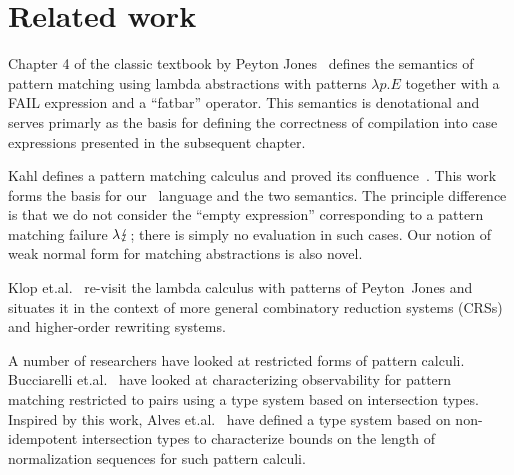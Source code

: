 
\section{Related work}\label{sec:related}

Chapter 4 of the classic textbook by Peyton Jones~\cite{spj_1987}
defines the semantics of pattern matching using lambda abstractions
with patterns $\lambda p.E$ together with a \textsf{FAIL} expression
and a ``fatbar'' operator. This semantics is
denotational and serves primarly as the basis for defining the
correctness of compilation into case expressions presented in
the subsequent chapter.

Kahl defines a pattern matching calculus and proved its
confluence~\cite{kahl_2004}. This work forms the basis for our
\lambdaPMC\ language and the two semantics. The principle difference
is that we do not consider the ``empty expression'' corresponding to a
pattern matching failure $\lambda\lightning$; there is simply no
evaluation in such cases.  Our notion of weak normal form for matching
abstractions is also novel. %

Klop et.\@ al.\@~\cite{KLOP200816} re-visit the lambda calculus with
patterns of Peyton~Jones and situates it in the context of more
general combinatory reduction systems (CRSs) and higher-order
rewriting systems.

A number of researchers have looked at restricted forms of pattern
calculi.  Bucciarelli et.\@ al.\@~\cite{bucciarelli_et_al_2015} have
looked at characterizing observability for pattern matching restricted
to pairs using a type system based on intersection types.  Inspired by
this work, Alves et.\@ al.\@~\cite{alves_et_al_2020} have defined a type system based on
non-idempotent intersection types to characterize bounds on the length
of normalization sequences for such pattern
calculi.


